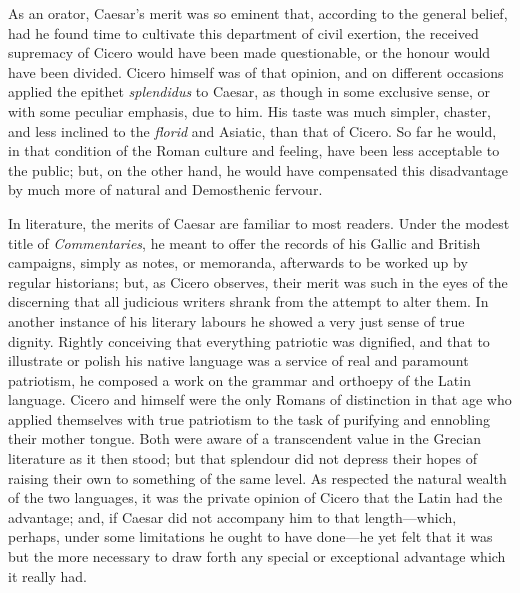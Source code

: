 As an orator, Caesar's merit was so eminent that, according to the
general belief, had he found time to cultivate this department of civil
exertion, the received supremacy of Cicero would have been made
questionable, or the honour would have been divided. Cicero himself was
of that opinion, and on different occasions applied the epithet
\emph{splendidus} to Caesar, as though in some exclusive sense, or with some
peculiar emphasis, due to him. His taste was much simpler, chaster, and
less inclined to the \emph{florid} and Asiatic, than that of Cicero. So far
he would, in that condition of the Roman culture and feeling, have been
less acceptable to the public; but, on the other hand, he would have
compensated this disadvantage by much more of natural and Demosthenic
fervour.

In literature, the merits of Caesar are familiar to most readers. Under
the modest title of \emph{Commentaries}, he meant to offer the records of his
Gallic and British campaigns, simply as notes, or memoranda, afterwards
to be worked up by regular historians; but, as Cicero observes, their
merit was such in the eyes of the discerning that all judicious writers
shrank from the attempt to alter them. In another instance of his
literary labours he showed a very just sense of true dignity. Rightly
conceiving that everything patriotic was dignified, and that to
illustrate or polish his native language was a service of real and
paramount patriotism, he composed a work on the grammar and orthoepy of
the Latin language. Cicero and himself were the only Romans of
distinction in that age who applied themselves with true patriotism to
the task of purifying and ennobling their mother tongue. Both were aware
of a transcendent value in the Grecian literature as it then stood; but
that splendour did not depress their hopes of raising their own to
something of the same level. As respected the natural wealth of the two
languages, it was the private opinion of Cicero that the Latin had the
advantage; and, if Caesar did not accompany him to that length—which,
perhaps, under some limitations he ought to have done—he yet felt that
it was but the more necessary to draw forth any special or exceptional
advantage which it really had.

